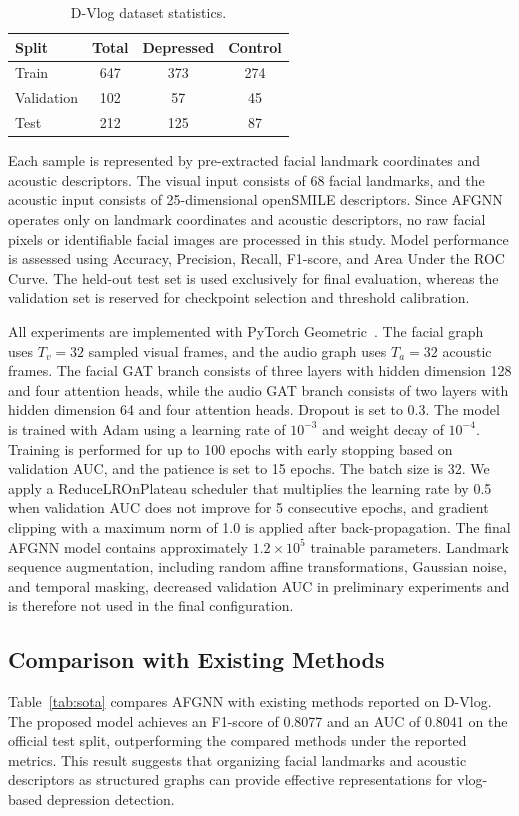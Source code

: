 \documentclass[conference]{IEEEtran}
\begin{document}
\begin{table}[htb]
\centering
\caption{D-Vlog dataset statistics.}
\label{tab:dataset}
\begin{tabular}{lccc}
\toprule[1.2pt]
Split & Total & Depressed & Control \\
\midrule[0.8pt]
Train & 647 & 373 & 274 \\
Validation & 102 & 57 & 45 \\
Test & 212 & 125 & 87 \\
\bottomrule[1.2pt]
\end{tabular}
\end{table}


Each sample is represented by pre-extracted facial landmark coordinates and acoustic descriptors. The visual input consists of 68 facial landmarks, and the acoustic input consists of 25-dimensional openSMILE descriptors. Since AFGNN operates only on landmark coordinates and acoustic descriptors, no raw facial pixels or identifiable facial images are processed in this study. Model performance is assessed using Accuracy, Precision, Recall, F1-score, and Area Under the ROC Curve. The held-out test set is used exclusively for final evaluation, whereas the validation set is reserved for checkpoint selection and threshold calibration.


All experiments are implemented with PyTorch Geometric~\cite{fey2019fast}. The facial graph uses $T_v=32$ sampled visual frames, and the audio graph uses $T_a=32$ acoustic frames. The facial GAT branch consists of three layers with hidden dimension 128 and four attention heads, while the audio GAT branch consists of two layers with hidden dimension 64 and four attention heads. Dropout is set to 0.3. The model is trained with Adam using a learning rate of $10^{-3}$ and weight decay of $10^{-4}$. Training is performed for up to 100 epochs with early stopping based on validation AUC, and the patience is set to 15 epochs. The batch size is 32. We apply a ReduceLROnPlateau scheduler that multiplies the learning rate by 0.5 when validation AUC does not improve for 5 consecutive epochs, and gradient clipping with a maximum norm of 1.0 is applied after back-propagation. The final AFGNN model contains approximately $1.2\times10^5$ trainable parameters. Landmark sequence augmentation, including random affine transformations, Gaussian noise, and temporal masking, decreased validation AUC in preliminary experiments and is therefore not used in the final configuration.

\subsection{Comparison with Existing Methods}
Table~\ref{tab:sota} compares AFGNN with existing methods reported on D-Vlog. The proposed model achieves an F1-score of 0.8077 and an AUC of 0.8041 on the official test split, outperforming the compared methods under the reported metrics. This result suggests that organizing facial landmarks and acoustic descriptors as structured graphs can provide effective representations for vlog-based depression detection.
\end{document}
